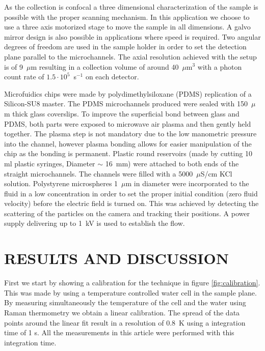 \documentclass[]{spie}  %
\begin{document}
As the collection is confocal a three dimensional characterization of the sample is possible with the proper scanning mechanism. In this application we choose to use a three axis motorized stage to move the sample in all dimensions. A galvo mirror design is also possible in applications where speed is required. Two angular degrees of freedom are used in the sample holder in order to set the detection plane parallel to the microchannels. The axial resolution achieved with the setup is of 9~$\mu \mathrm{m}$ resulting in a collection volume of around 40~$\mu \mathrm{m}^3$ with a photon count rate of $1.5 \cdot 10^5$~s$^{-1}$ on each detector.  

Microfuidics chips were made by polydimethylsiloxane (PDMS) replication of a Silicon-SU8 master. The PDMS microchannels produced were sealed with 150~$\mu$m thick glass coverslips. To improve the superficial bond between glass and PDMS, both parts were exposed to microwave air plasma and then gently held together. The plasma step is not mandatory due to the low manometric pressure into the channel, however plasma bonding allows for easier manipulation of the chip as the bonding is permanent. Plastic round reservoirs (made by cutting 10 ml plastic syringes, Diameter $\sim$ 16~mm) were attached to both ends of the straight microchannels. The channels were filled with a 5000~$\mu$S/cm KCl solution. Polystyrene microspheres 1~$\mu$m in diameter were incorporated to the fluid in a low concentration in order to set the proper initial condition (zero fluid velocity) before the electric field is turned on. This was achieved by detecting the scattering of the particles on the camera and tracking their positions. A power supply delivering up to 1~kV is used to establish the flow.
 
\section{RESULTS AND DISCUSSION}


First we start by showing a calibration for the technique in figure \ref{fig:calibration}. This was made by using a temperature controlled water cell in the sample plane. By measuring simultaneously the temperature of the cell and the water using Raman thermometry we obtain a linear calibration. The spread of the data points around the linear fit result in a resolution of 0.8~K using a integration time of 1 s. All the measurements in this article were performed with this integration time. 
\end{document}
